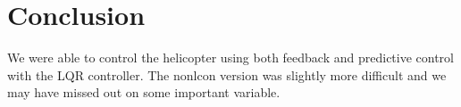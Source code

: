 \section{Conclusion}\label{sec:conclusion}
We were able to control the helicopter using both feedback and predictive control with the LQR controller. The nonlcon version was slightly more difficult and we may have missed out on some important variable.
